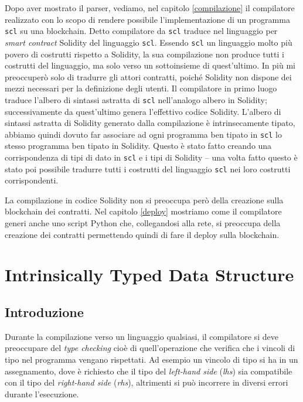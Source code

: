\documentclass[12pt,a4paper]{report}
\begin{document}
Dopo aver mostrato il parser, vediamo, nel capitolo \ref{compilazione}
il compilatore realizzato con lo scopo di rendere possibile
l'implementazione di un programma \texttt{scl} su una blockchain. Detto
compilatore da \texttt{scl} traduce nel linguaggio per \emph{smart
contract} Solidity del linguaggio \texttt{scl}. Essendo \texttt{scl} un
linguaggio molto più povero di costrutti rispetto a Solidity, la sua
compilazione non produce tutti i costrutti del linguaggio, ma solo verso
un sottoinsieme di quest'ultimo. In più mi preoccuperò solo di tradurre
gli attori contratti, poiché Solidity non dispone dei mezzi necessari
per la definizione degli utenti. Il compilatore in primo luogo traduce
l'albero di sintassi astratta di \texttt{scl} nell'analogo albero in
Solidity; successivamente da quest'ultimo genera l'effettivo codice
Solidity. L'albero di sintassi astratta di Solidity generato dalla
compilazione è intrinsecamente tipato, abbiamo quindi dovuto far
associare ad ogni programma ben tipato in \texttt{scl} lo stesso
programma ben tipato in Solidity. Questo è stato fatto creando una
corrispondenza di tipi di dato in \texttt{scl} e i tipi di Solidity --
una volta fatto questo è stato poi possibile tradurre tutti i costrutti
del linguaggio \texttt{scl} nei loro costrutti corrispondenti.

La compilazione in codice Solidity non si preoccupa però della creazione
sulla blockchain dei contratti. Nel capitolo \ref{deploy} mostriamo come
il compilatore generi anche uno script Python che, collegandosi alla
rete, si preoccupa della creazione dei contratti permettendo quindi di
fare il deploy sulla blockchain.

\newpage

\hypertarget{intrinsically-typed-data-structure}{%
\chapter{Intrinsically Typed Data
Structure}\label{intrinsically-typed-data-structure}}

\hypertarget{introduzione-1}{%
\section{Introduzione}\label{introduzione-1}}

Durante la compilazione verso un linguaggio qualsiasi, il compilatore si
deve preoccupare del \emph{type checking} cioè di quell'operazione che
verifica che i vincoli di tipo nel programma vengano rispettati. Ad
esempio un vincolo di tipo si ha in un assegnamento, dove è richiesto
che il tipo del \emph{left-hand side} (\emph{lhs}) sia compatibile con
il tipo del \emph{right-hand side} (\emph{rhs}), altrimenti si può
incorrere in diversi errori durante l'esecuzione.
\end{document}
